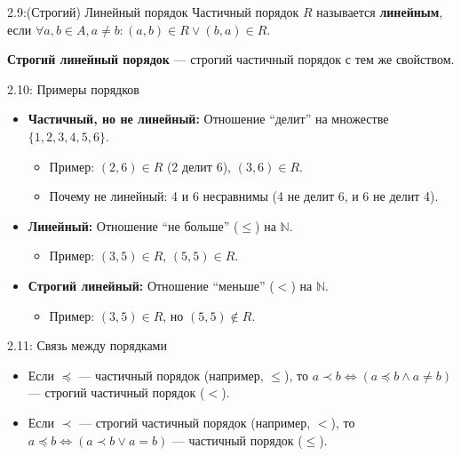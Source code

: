 \documentclass[a4paper,12pt]{article}
\begin{document}
	\begin{definitionbox}{2.9:(Строгий) Линейный порядок}
		Частичный порядок $R$ называется \textbf{линейным}, если 
		$\forall a,b \in A, a \neq b: (a,b) \in R \lor (b,a) \in R$.
		
		\textbf{Строгий линейный порядок} — строгий частичный порядок с тем же свойством.
	\end{definitionbox}

	
	\begin{examplebox}{2.10: Примеры порядков}
		\begin{itemize}
			\item \textbf{Частичный, но не линейный:} Отношение ``делит'' на множестве $\{1,2,3,4,5,6\}$.
			\begin{itemize}
				\item Пример: $(2,6) \in R$ (2 делит 6), $(3,6) \in R$.
				\item Почему не линейный: 4 и 6 несравнимы (4 не делит 6, и 6 не делит 4).
			\end{itemize}
			\item \textbf{Линейный:} Отношение ``не больше'' ($\le$) на $\mathbb{N}$.
			\begin{itemize}
				\item Пример: $(3,5) \in R$, $(5,5) \in R$.
			\end{itemize}
			\item \textbf{Строгий линейный:} Отношение ``меньше'' ($<$) на $\mathbb{N}$.
			\begin{itemize}
				\item Пример: $(3,5) \in R$, но $(5,5) \notin R$.
			\end{itemize}
		\end{itemize}
	\end{examplebox}
	
	\begin{notebook}{2.11: Связь между порядками}
		\begin{itemize}
			\item Если $\preceq$ — частичный порядок (например, $\le$), то $a \prec b \iff (a \preceq b \land a \neq b)$ — строгий частичный порядок ($<$).
			\item Если $\prec$ — строгий частичный порядок (например, $<$), то $a \preceq b \iff (a \prec b \lor a = b)$ — частичный порядок ($\le$).
		\end{itemize}
	\end{notebook}
\end{document}
